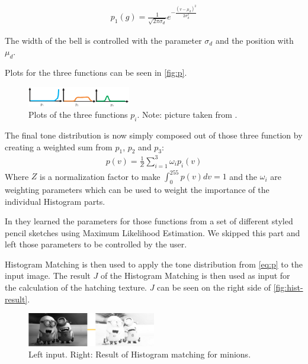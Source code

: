 \begin{align}
  p_1(g) = \frac{1}{\sqrt{2\pi \sigma_d}} e^{-\frac{(v-\mu_d)^2}{2\sigma_d^2}} 
  \label{eq:p_3}
\end{align}

The width of the bell is controlled with the parameter $\sigma_d$ and the
position with $\mu_d$.

Plots for the three functions can be seen in \autoref{fig:p}.

\begin{figure}[htb]
  \centering
  \includegraphics[width=0.4\textwidth]{images/p_i.png}
  \caption{Plots of the three functions $p_i$. Note: picture taken from
    \cite{mainPaper}.}
  \label{fig:p}
\end{figure}

The final tone distribution is now simply composed out of those three
function by creating a weighted sum from $p_1$, $p_2$ and $p_3$:
\begin{align}
  p(v) = \frac{1}{Z} \sum_{i=1}^{3}\omega_i p_i(v)
  \label{eq:p}
\end{align}
Where $Z$ is a normalization factor to make $\int_0^{255}p(v)dv = 1$ and the
$\omega_i$ are weighting parameters which can be used to weight the importance of
the individual Histogram parts.

In \cite{mainPaper} they learned the parameters for those functions from a set
of different styled pencil sketches using Maximum Likelihood Estimation. We skipped this part and left those
parameters to be controlled by the user.

Histogram Matching is then  used to apply the tone distribution from \autoref{eq:p} to
the input image. The result $J$ of the Histogram Matching is then used as input
for the calculation of the hatching texture.  $J$ can be seen on the right side
of \autoref{fig:hist-result}.

\begin{figure}[htb]
  \centering
  \includegraphics[width=0.5\textwidth]{images/tone-result.png}
  \caption{Left input. Right: Result of Histogram matching for minions.}
  \label{fig:hist-result}
\end{figure}

